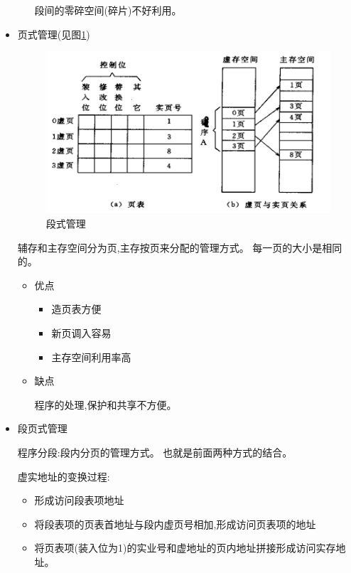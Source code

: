 \documentclass[UTF8,a4paper]{ctexart}%
\begin{document}
\begin{itemize}
\begin{itemize}
                      段间的零碎空间(碎片)不好利用。

                \end{itemize}

            \item 页式管理(见图\ref{fig3})
                \begin{figure}[!htp]
                  \centering
                  \includegraphics[scale=0.3]{assets/jisuanjizucheng2_5f756.png}
                  \caption{段式管理}
                  \label{fig3}
                \end{figure}

                辅存和主存空间分为页,主存按页来分配的管理方式。
                每一页的大小是相同的。
                \begin{itemize}
                  \item 优点
                      \begin{itemize}
                        \item 造页表方便
                        \item 新页调入容易
                        \item 主存空间利用率高
                      \end{itemize}
                  \item 缺点

                      程序的处理,保护和共享不方便。
                \end{itemize}

            \item 段页式管理

                程序分段:段内分页的管理方式。
                也就是前面两种方式的结合。

                虚实地址的变换过程:
                \begin{itemize}
                  \item [1] 形成访问段表项地址
                  \item [2] 将段表项的页表首地址与段内虚页号相加,形成访问页表项的地址
                  \item[3] 将页表项(装入位为1)的实业号和虚地址的页内地址拼接形成访问实存地址。
                \end{itemize}


\end{itemize}
\end{document}
